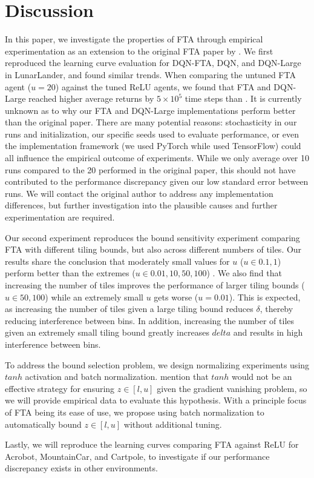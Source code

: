 \documentclass{article}
\begin{document}
\section{Discussion} \label{sec:discussion}
In this paper, we investigate the properties of FTA through empirical experimentation as an extension to the original FTA paper by \cite[]{pan2019fuzzy}. 
We first reproduced the learning curve evaluation for DQN-FTA, DQN, and DQN-Large in LunarLander, and found similar trends. 
When comparing the untuned FTA agent ($u = 20$) against the tuned ReLU agents, we found that FTA and DQN-Large reached higher average returns 
by $5\times10^5$ time steps than \cite{pan2019fuzzy}. It is currently unknown as to why our FTA and DQN-Large implementations perform better than the original paper. 
There are many potential reasons: stochasticity in our runs and initialization, our specific seeds used to evaluate performance, or even the implementation framework 
(we used PyTorch while \cite{pan2019fuzzy} used TensorFlow) could all influence the empirical outcome of experiments. 
While we only average over 10 runs compared to the 20 performed in the original paper, this should not have contributed to the performance discrepancy 
given our low standard error between runs. We will contact the original author to address any implementation differences, 
but further investigation into the plausible causes and further experimentation are required.

Our second experiment reproduces the bound sensitivity experiment comparing FTA with different tiling bounds, 
but also across different numbers of tiles. Our results share the conclusion that moderately small values for $u$ ($u \in {0.1, 1}$) 
perform better than the extremes ($u \in {0.01, 10, 50, 100}$) \cite[]{pan2019fuzzy}. We also find that increasing the number of tiles 
improves the performance of larger tiling bounds ($u \in {50, 100}$) while an extremely small $u$ gets worse ($u = 0.01$). This is expected, 
as increasing the number of tiles given a large tiling bound reduces $\delta$, thereby reducing interference between bins. In addition, 
increasing the number of tiles given an extremely small tiling bound greatly increases $delta$ and results in high interference between bins.

To address the bound selection problem, we design normalizing experiments using $tanh$ activation and batch normalization. 
\cite{pan2019fuzzy} mention that $tanh$ would not be an effective strategy for ensuring $z \in [l,u]$ given the gradient vanishing problem, 
so we will provide empirical data to evaluate this hypothesis. With a principle focus of FTA being its ease of use, 
we propose using batch normalization to automatically bound $z \in [l,u]$ without additional tuning.

Lastly, we will reproduce the learning curves comparing FTA against ReLU for Acrobot, MountainCar, and Cartpole, 
to investigate if our performance discrepancy exists in other environments.


\newpage

\end{document}
